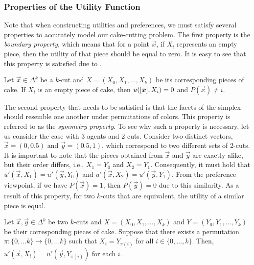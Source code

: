 \subsubsection*{Properties of the Utility Function} 

Note that when constructing utilities and preferences, we must satisfy several properties to accurately model our cake-cutting problem. The first property is the {\em boundary property}, which means that for a point $\vec{x}$, if $X_i$ represents an empty piece, then the utility of that piece should be equal to zero. It is easy to see that this property is satisfied due to .




\begin{property}[Boundary]\label{prt:boundry-condition}
    Let $\vec{x} \in \Delta^k$ be a $k$-cut and $X = (X_0, X_1, \ldots, X_k)$ be its corresponding pieces of cake. If $X_i$ is an empty piece of cake, then $u([\boldsymbol{x}], X_i) = 0$ and $P(\vec{x}) \neq i$. 
\end{property}


The second property that needs to be satisfied is that the facets of the simplex should resemble one another under permutations of colors. This property is referred to as the {\em symmetry property}. To see why such a property is necessary, let us consider the case with 3 agents and 2 cuts. Consider two distinct vectors, $\vec{x} = (0, 0.5)$ and $\vec{y} = (0.5, 1)$, which correspond to two different sets of 2-cuts. It is important to note that the pieces obtained from $\vec{x}$ and $\vec{y}$ are exactly alike, but their order differs, i.e., $X_1 = Y_0$ and $X_2 = Y_1$. Consequently, it must hold that $u'(\vec{x}, X_1) = u'(\vec{y}, Y_0)$ and $u'(\vec{x}, X_2) = u'(\vec{y}, Y_1)$. From the preference viewpoint, if we have $P(\vec{x}) = 1$, then $P(\vec{y}) = 0$ due to this similarity. As a result of this property, for two $k$-cuts that are equivalent, the utility of a similar piece is equal.


\begin{property}[Symmetry]\label{prt:first-symmetry}
Let $\vec{x}, \vec{y} \in \Delta^k$ be two $k$-cuts and $X = (X_0, X_1, \ldots, X_k)$ and $Y = (Y_0, Y_1, \ldots, Y_k)$ be their corresponding pieces of cake. Suppose that there exists a permutation $\pi: \{0, \ldots k\} \rightarrow \{0, \ldots k\}$ such that $X_i = Y_{\pi(i)}$ for all $i \in \{0, \ldots, k\}$. Then, $u'(\vec{x}, X_i) = u'(\vec{y}, Y_{\pi(i)})$ for each $i$.
\end{property}


